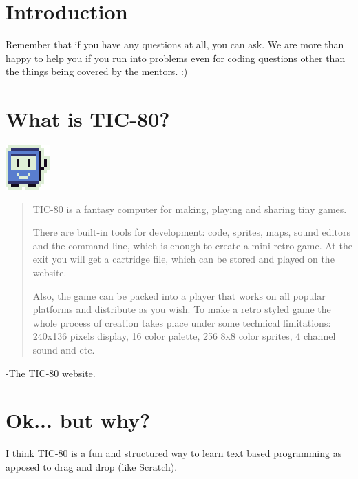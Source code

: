 \documentclass[10pt, twocolumn]{article}
\date{}
\begin{document}
\section{Introduction}
Remember that if you have any questions at all, you can ask. We are more than happy to help you if you run into problems even for coding questions other than the things being covered by the mentors. :)

\section{What is TIC-80?}
\begin{center}
	\includegraphics{logo64.png}
\end{center}

\begin{quotation}
TIC-80 is a fantasy computer for making, playing and sharing tiny games.

There are built-in tools for development: code, sprites, maps, sound editors and the command line, which is enough to create a mini retro game. At the exit you will get a cartridge file, which can be stored and played on the website. 

Also, the game can be packed into a player that works on all popular platforms and distribute as you wish. To make a retro styled game the whole process of creation takes place under some technical limitations: 240x136 pixels display, 16 color palette, 256 8x8 color sprites, 4 channel sound and etc. 
\end{quotation}
\hfill -The TIC-80 website.

\section{Ok... but why?}
I think TIC-80 is a fun and structured way to learn text based programming as apposed to drag and drop (like Scratch).
\end{document}
